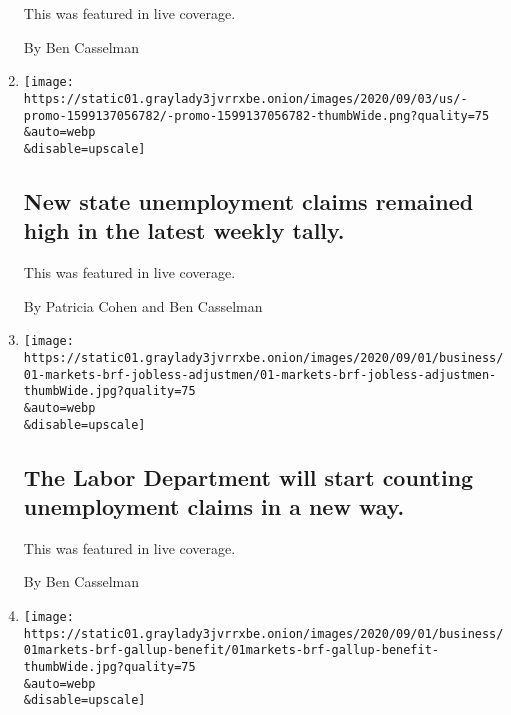 \begin{enumerate}
  This was featured in live coverage.

  By Ben Casselman
\item
  \href{/live/2020/09/03/business/stock-market-today-coronavirus/new-state-unemployment-claims-remained-high-in-the-latest-weekly-tally}{}

  \texttt{[image: https://static01.graylady3jvrrxbe.onion/images/2020/09/03/us/-promo-1599137056782/-promo-1599137056782-thumbWide.png?quality=75\\\&auto=webp\\\&disable=upscale]}

  \hypertarget{new-state-unemployment-claims-remained-high-in-the-latest-weekly-tally}{%
  \subsection{New state unemployment claims remained high in the latest
  weekly
  tally.}\label{new-state-unemployment-claims-remained-high-in-the-latest-weekly-tally}}

  This was featured in live coverage.

  By Patricia Cohen and Ben Casselman
\item
  \href{/live/2020/09/01/business/stock-market-today-coronavirus/the-labor-department-will-start-counting-unemployment-claims-in-a-new-way}{}

  \texttt{[image: https://static01.graylady3jvrrxbe.onion/images/2020/09/01/business/01-markets-brf-jobless-adjustmen/01-markets-brf-jobless-adjustmen-thumbWide.jpg?quality=75\\\&auto=webp\\\&disable=upscale]}

  \hypertarget{the-labor-department-will-start-counting-unemployment-claims-in-a-new-way}{%
  \subsection{The Labor Department will start counting unemployment
  claims in a new
  way.}\label{the-labor-department-will-start-counting-unemployment-claims-in-a-new-way}}

  This was featured in live coverage.

  By Ben Casselman
\item
  \href{/live/2020/09/01/business/stock-market-today-coronavirus/extra-unemployment-pay-deters-few-from-seeking-work-a-survey-finds}{}

  \texttt{[image: https://static01.graylady3jvrrxbe.onion/images/2020/09/01/business/01markets-brf-gallup-benefit/01markets-brf-gallup-benefit-thumbWide.jpg?quality=75\\\&auto=webp\\\&disable=upscale]}


\end{enumerate}
